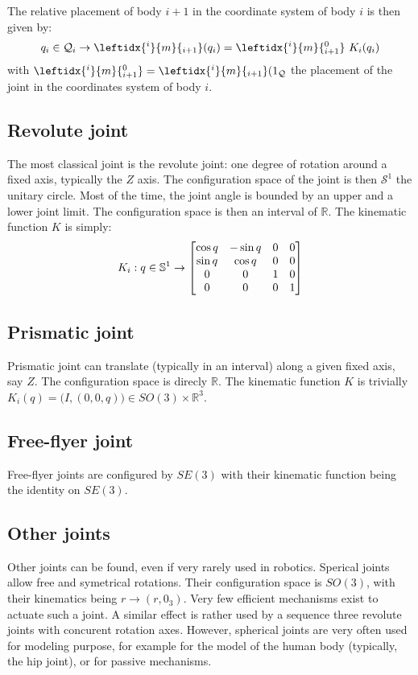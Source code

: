 \documentclass{book}
\begin{document}
The relative placement of body $i+1$ in the coordinate system of body $i$ is then given by:
\[ q_i \in \mathcal{Q}_i \rightarrow \leftidx{^i}{m}{_{i+1}}(q_i) = \leftidx{^i}{m}{_{i+1}^0} \  K_i(q_i) \]
with $\leftidx{^i}{m}{_{i+1}^0} = \leftidx{^i}{m}{_{i+1}}(1_\mathcal{Q}$ the placement of the joint in the coordinates system of body $i$.


\subsection{Revolute joint}

The most classical joint is the revolute joint: one degree of rotation around a fixed axis, typically the $Z$ axis. The configuration space of the joint is then $\mathcal{S}^1$ the unitary circle. Most of the time, the joint angle is bounded by an upper and a lower joint limit. The configuration space is then an interval of $\mathbb{R}$. The kinematic function $K$ is simply:
\[ K_i: q \in \mathbb{S}^1 \rightarrow \begin{bmatrix} \cos q & -\sin q & 0 & 0 \\ \sin q & \cos q & 0 & 0 \\ 0 & 0 & 1 & 0 \\ 0 & 0 & 0 & 1 \end{bmatrix} \]

\subsection{Prismatic joint}

Prismatic joint can translate (typically in an interval) along a given fixed axis, say $Z$. The configuration space is direcly $\mathbb{R}$. The kinematic function $K$ is trivially $K_i(q) = \big(I,(0,0,q)\big) \in SO(3)\times\mathbb{R}^3$.

\subsection{Free-flyer joint}

Free-flyer joints are configured by $SE(3)$ with their kinematic function being the identity on $SE(3)$. 

\subsection{Other joints}

Other joints can be found, even if very rarely used in robotics. Sperical joints allow free and symetrical rotations. Their configuration space is $SO(3)$, with their kinematics being $r \rightarrow (r,0_3)$. Very few efficient mechanisms exist to actuate such a joint. A similar effect is rather used by a sequence three revolute joints with concurent rotation axes. However, spherical joints are very often used for modeling purpose, for example for the model of the human body (typically, the hip joint), or for passive mechanisms.
\end{document}

